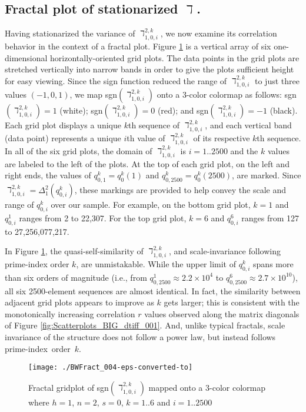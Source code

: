 \documentclass[12pt,longtitle,times]{amsart}
\begin{document}
\subsection[short]{Fractal plot of stationarized $\daleth$.} 
Having stationarized the variance of $\daleth_{1,0,i}^{2,k}$, we now examine its correlation behavior in the context of a fractal plot. Figure \ref{fig:BWFract_002} is a vertical array of six one-dimensional horizontally-oriented grid plots. The data points in the grid plots are stretched vertically into narrow bands in order to give the plots sufficient height for easy viewing. Since the sign function reduced the range of $\daleth_{1,0,i}^{2,k}$ to just three values $(-1,0,1)$, we map sgn$(\daleth_{1,0,i}^{2,k})$ onto a 3-color colormap as follows: sgn$(\daleth_{1,0,i}^{2,k})=1$ (white); sgn$(\daleth_{1,0,i}^{2,k})=0$ (red); and sgn$(\daleth_{1,0,i}^{2,k})=-1$ (black). Each grid plot displays a unique $k$th sequence of $\daleth_{1,0,i}^{2,k}$, and each vertical band (data point) represents a unique $i$th value of $\daleth_{1,0,i}^{2,k}$ of its respective $k$th sequence. In all of the six grid plots, the domain of $\daleth_{1,0,i}^{2,k}$ is $i = 1..2500$ and the $k$ values are labeled to the left of the plots. At the top of each grid plot, on the left and right ends, the values of $q_{0,1}^k=q_0^k(1)$ and $q_{0,2500}^k=q_0^k(2500)$, are marked. Since $\daleth_{1,0,i}^{2,k} = \Delta_1^2(q_{0,i}^k)$, these markings are provided to help convey the scale and range of $q_{0,i}^k$ over our sample. For example, on the bottom grid plot, $k=1$ and $q_{0,i}^1$ ranges from 2 to 22,307. For the top grid plot, $k=6$ and $q_{0,i}^6$ ranges from 127 to 27,256,077,217.

In Figure \ref{fig:BWFract_002}, the quasi-self-similarity of $\daleth_{1,0,i}^{2,k}$, and scale-invariance following prime-index order $k$, are unmistakable. While the upper limit of $q_{0,i}^k$ spans more than six orders of magnitude (i.e., from  $q_{0,2500}^1\approx{}2.2\times{}10^4$ to $q_{0,2500}^6\approx{}2.7\times{}10^{10}$), all six 2500-element sequences are almost identical. In fact, the similarity between adjacent grid plots appears to improve as $k$ gets larger; this is consistent with the monotonically increasing correlation $r$ values observed along the matrix diagonals of Figure \ref{fig:Scatterplots_BIG_dtiff_001}. And, unlike typical fractals, scale invariance of the structure does not follow a power law, but instead follows \mbox{prime-index order $k$.}

\begin{figure}[h]
\centering
\texttt{[image: ./BWFract\_004-eps-converted-to]}
\caption{Fractal gridplot of sgn$(\daleth_{1,0,i}^{2,k})$ mapped onto a 3-color colormap where $h=1$, $n=2$, $s=0$, $k=1..6$ and $i=1..2500$}
\label{fig:BWFract_002}
\end{figure}
\end{document}
